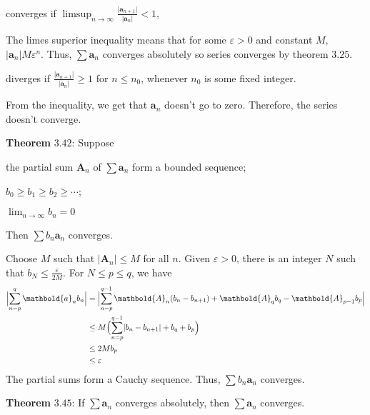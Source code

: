\begin{exercise}
\begin{exercise}[label = (\alph*)]
  \item
    converges if \(\limsup_{n\to\infty}\frac{\lvert\mathbold{a}_{n + 1}\rvert}
    {\lvert\mathbold{a}_n\rvert} < 1\),
    \par\smallskip
    The limes superior inequality means that for some \(\varepsilon > 0\) and
    constant \(M\), \(\lvert\mathbold{a}_n\rvert M\varepsilon ^n\).
    Thus, \(\sum\mathbold{a}_n\) converges absolutely so series converges by
    theorem \(3.25\).
  \item
    diverges if \(\frac{\lvert\mathbold{a}_{n + 1}\rvert}
    {\lvert\mathbold{a}_n\rvert}\geq 1\) for \(n\leq n_0\), whenever \(n_0\) is
    some fixed integer.
    \par\smallskip
    From the inequality, we get that \(\mathbold{a}_n\) doesn't go to zero.
    Therefore, the series doesn't converge.
  \end{exercise}
  \textbf{Theorem} \(\mathbold{3.42}\): Suppose
  \begin{exercise}[label = (\alph*)]
  \item
    the partial sum \(\mathbold{A}_n\) of \(\sum\mathbold{a}_n\) form a bounded
    sequence;
  \item
    \(b_0\geq b_1\geq b_2\geq\cdots\);
  \item
    \(\lim_{n\to\infty}b_n = 0\)
  \end{exercise}
  Then \(\sum b_n\mathbold{a}_n\) converges.
  \par\smallskip
  Choose \(M\) such that \(\lvert\mathbold{A}_n\rvert\leq M\) for all \(n\).
  Given \(\varepsilon > 0\), there is an integer \(N\) such that
  \(b_N\leq\frac{\varepsilon}{2M}\).
  For \(N\leq p\leq q\), we have
  \begin{align*}
    \Bigl\lvert\sum_{n = p}^q\mathbold{a}_nb_n\Bigr\rvert
    & = \Bigl\lvert\sum_{n = p}^{q - 1}\mathbold{A}_n(b_n - b_{n + 1}) +
      \mathbold{A}_qb_q - \mathbold{A}_{p - 1}b_p\Bigr\rvert\\
    & \leq M\Bigl(\sum_{n = p}^{q - 1}\lvert b_n - b_{n + 1}\rvert + b_q +
      b_p\Bigr)\\
    & \leq 2Mb_p\\
    & \leq \varepsilon
  \end{align*}
  The partial sums form a Cauchy sequence.
  Thus, \(\sum b_n\mathbold{a}_n\) converges.
  \par\smallskip
  \textbf{Theorem} \(\mathbold{3.45}\): If \(\sum\mathbold{a}_n\) converges
  absolutely, then \(\sum\mathbold{a}_n\) converges.
  \par\smallskip

\end{exercise}
